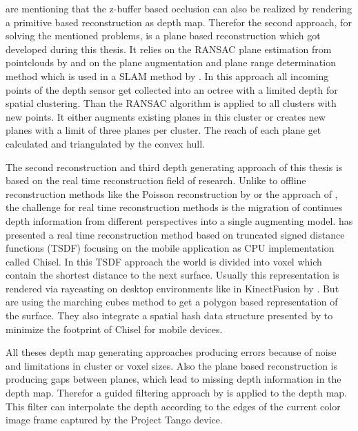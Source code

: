 \documentclass[12pt]{support/thcolognereport}
\begin{document}
\citet{breen1996interactive} are mentioning that the z-buffer based occlusion can also be realized by rendering a primitive based reconstruction as depth map. Therefor the second approach, for solving the mentioned problems, is a plane based reconstruction which got developed during this thesis. It relies on the RANSAC plane estimation from pointclouds by \citet{yang2010plane} and on the plane augmentation and plane range determination method which is used in a SLAM method by \citet{trevor2012planar}. In this approach all incoming points of the depth sensor get collected into an octree with a limited depth for spatial clustering. Than the RANSAC algorithm is applied to all clusters with new points. It either augments existing planes in this cluster or creates new planes with a limit of three planes per cluster. The reach of each plane get calculated and triangulated by the convex hull. 

The second reconstruction and third depth generating approach of this thesis is based on the real time reconstruction field of research. Unlike to offline reconstruction methods like the Poisson reconstruction by \citet{kazhdan2006poisson} or the approach of \citet{hoppe1992surface}, the challenge for real time reconstruction methods is the migration of continues depth information from different perspectives into a single augmenting model. \citet{Klingensmith_2015_7924} has presented a real time reconstruction method based on truncated signed distance functions (TSDF) focusing on the mobile application as CPU implementation called Chisel. In this TSDF approach the world is divided into voxel which contain the shortest distance to the next surface. Usually this representation is rendered via raycasting on desktop environments like in KinectFusion by \citet{newcombe2011kinectfusion}. But \citet{Klingensmith_2015_7924} are using the marching cubes method to get a polygon based representation of the surface. They also integrate a spatial hash data structure presented by \citet{niessner2013real} to minimize the footprint of Chisel for mobile devices.

All theses depth map generating approaches producing errors because of noise and limitations in cluster or voxel sizes. Also the plane based reconstruction is producing gaps between planes, which lead to missing depth information in the depth map. Therefor a guided filtering approach by \citet{he2010guided} is applied to the depth map. This filter can interpolate the depth according to the edges of the current color image frame captured by the Project Tango device. 
\end{document}
